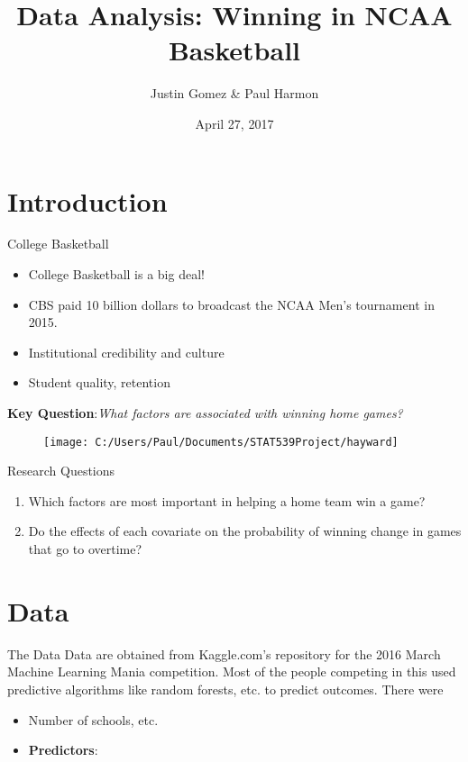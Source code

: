 \documentclass{beamer}
\title[NCAA Basketball]{Data Analysis: Winning in NCAA Basketball}
\author{Justin Gomez \& Paul Harmon}
\date{April 27, 2017}
\begin{document}
	
	\begin{frame}
		\titlepage
	\end{frame}
	

	\section{Introduction}
	
	\begin{frame}{College Basketball}
	\begin{multicols}{2}
		\begin{itemize}
		\item College Basketball is a big deal! 
		\item CBS paid 10 billion dollars to broadcast the NCAA Men's tournament in 2015. 
		\item Institutional credibility and culture
		\item Student quality, retention
		
		
		
	\end{itemize}
\textbf{Key Question}:\textit{What factors are associated with winning home games? }
	\begin{figure}[r]
		\texttt{[image: C:/Users/Paul/Documents/STAT539Project/hayward]}
	\end{figure}
\end{multicols}
	
	\end{frame}

\begin{frame}{Research Questions}
\begin{enumerate}
	\item %
	Which factors are most important in helping a home team win a game?
	\item %
	Do the effects of each covariate on the probability of winning change in games that go to overtime?
\end{enumerate}
	
\end{frame}

	
\section{Data}
\begin{frame}{The Data}
	Data are obtained from Kaggle.com's repository for the 2016 March Machine Learning Mania competition. Most of the people competing in this used predictive algorithms like random forests, etc. to predict outcomes. There were 
		\\
		\begin{itemize}
			\item Number of schools, etc.  
			\item \textbf{Predictors}:  
			
		\end{itemize}
	
\end{frame}
\end{document}
